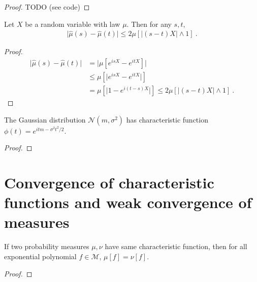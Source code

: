 \begin{proof}
\leanok
TODO (see code)
\end{proof}

\begin{lemma}\label{lem:abs_sub_charFun}
\leanok
{}
Let $X$ be a random variable with law $\mu$. Then for any $s, t$,
\begin{align*}
\vert \hat{\mu}(s) - \hat{\mu}(t) \vert
\le 2 \mu\left[ \left\vert (s - t) X\right\vert \wedge 1\right]
\: .
\end{align*}
\end{lemma}

\begin{proof}
\begin{align*}
\vert \hat{\mu}(s) - \hat{\mu}(t) \vert
&= \vert \mu\left[e^{isX} - e^{itX}\right] \vert
\\
&\le \mu\left[\vert e^{isX} - e^{itX} \vert\right]
\\
&= \mu\left[\vert 1 - e^{i(t - s)X} \vert\right]
\le 2 \mu\left[ \left\vert (s - t) X\right\vert \wedge 1\right]
\: .
\end{align*}
\end{proof}


\begin{lemma}\label{lem:gaussian_charFun}
\leanok
{}
The Gaussian distribution $\mathcal N(m, \sigma^2)$ has characteristic function $\phi(t) = e^{itm - \sigma^2 t^2 /2}$.
\end{lemma}

\begin{proof}\leanok
\end{proof}



\section{Convergence of characteristic functions and weak convergence of measures}


\begin{lemma}\label{lem:eq_M_of_eq_charFun}
If two probability measures $\mu, \nu$ have same characteristic function, then for all exponential polynomial $f \in \mathcal M$, $\mu[f] = \nu[f]$.
\end{lemma}

\begin{proof}
\end{proof}


